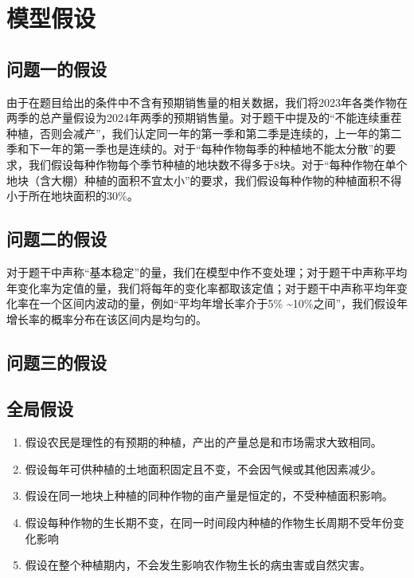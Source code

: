 \documentclass{cumcmthesis}
\begin{document}
\section{模型假设}
\subsection{问题一的假设}
由于在题目给出的条件中不含有预期销售量的相关数据，我们将2023年各类作物在两季的总产量假设为2024年两季的预期销售量。对于题干中提及的“不能连续重茬种植，否则会减产”，我们认定同一年的第一季和第二季是连续的，上一年的第二季和下一年的第一季也是连续的。对于“每种作物每季的种植地不能太分散”的要求，我们假设每种作物每个季节种植的地块数不得多于8块。对于“每种作物在单个地块（含大棚）种植的面积不宜太小”的要求，我们假设每种作物的种植面积不得小于所在地块面积的30\%。
\subsection{问题二的假设}
对于题干中声称“基本稳定”的量，我们在模型中作不变处理；对于题干中声称平均年变化率为定值的量，我们将每年的变化率都取该定值；对于题干中声称平均年变化率在一个区间内波动的量，例如“平均年增长率介于5\% \textasciitilde 10\%之间”，我们假设年增长率的概率分布在该区间内是均匀的。
\subsection{问题三的假设}
\subsection{全局假设}
\begin{enumerate}
    \item 假设农民是理性的有预期的种植，产出的产量总是和市场需求大致相同。
    \item 假设每年可供种植的土地面积固定且不变，不会因气候或其他因素减少。
    \item 假设在同一地块上种植的同种作物的亩产量是恒定的，不受种植面积影响。
    \item 假设每种作物的生长期不变，在同一时间段内种植的作物生长周期不受年份变化影响
    \item 假设在整个种植期内，不会发生影响农作物生长的病虫害或自然灾害。
\end{enumerate}
\end{document}

